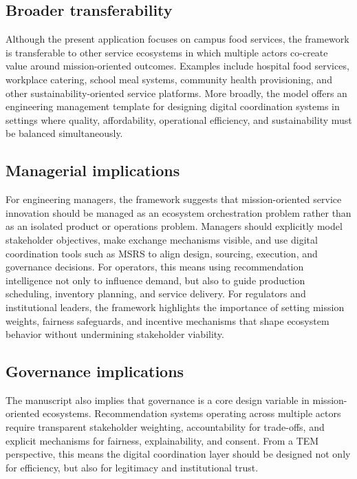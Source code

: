 \documentclass[
  letterpaper,
  DIV=11,
  numbers=noendperiod]{scrartcl}
\begin{document}
\subsection{Broader transferability}\label{broader-transferability}

Although the present application focuses on campus food services, the
framework is transferable to other service ecosystems in which multiple
actors co-create value around mission-oriented outcomes. Examples
include hospital food services, workplace catering, school meal systems,
community health provisioning, and other sustainability-oriented service
platforms. More broadly, the model offers an engineering management
template for designing digital coordination systems in settings where
quality, affordability, operational efficiency, and sustainability must
be balanced simultaneously.

\subsection{Managerial implications}\label{managerial-implications}

For engineering managers, the framework suggests that mission-oriented
service innovation should be managed as an ecosystem orchestration
problem rather than as an isolated product or operations problem.
Managers should explicitly model stakeholder objectives, make exchange
mechanisms visible, and use digital coordination tools such as MSRS to
align design, sourcing, execution, and governance decisions. For
operators, this means using recommendation intelligence not only to
influence demand, but also to guide production scheduling, inventory
planning, and service delivery. For regulators and institutional
leaders, the framework highlights the importance of setting mission
weights, fairness safeguards, and incentive mechanisms that shape
ecosystem behavior without undermining stakeholder viability.

\subsection{Governance implications}\label{governance-implications}

The manuscript also implies that governance is a core design variable in
mission-oriented ecosystems. Recommendation systems operating across
multiple actors require transparent stakeholder weighting,
accountability for trade-offs, and explicit mechanisms for fairness,
explainability, and consent. From a TEM perspective, this means the
digital coordination layer should be designed not only for efficiency,
but also for legitimacy and institutional trust.
\end{document}
